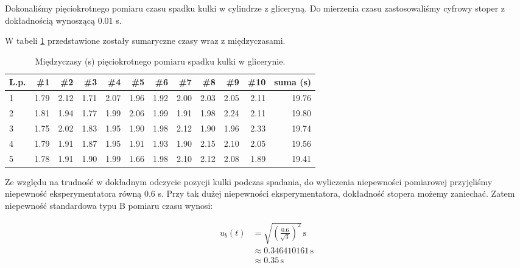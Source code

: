 \documentclass[a4paper]{article}
\newlength{\du}
\begin{document}
Dokonaliśmy pięciokrotnego pomiaru czasu spadku kulki w cylindrze z gliceryną.
Do mierzenia czasu zastosowaliśmy cyfrowy stoper z dokładnością wynoszącą $0.01$ s.

W tabeli \ref{gliceryna} przedstawione zostały sumaryczne czasy wraz z międzyczasami.

\begin{table}[h!]
	\centering
		\begin{tabular}{lrrrrrrrrrrr}
			\toprule
			L.p. &  \#1 & \#2 & \#3 & \#4 & \#5 & \#6 & \#7 & \#8 & \#9 & \#10 & suma (s)\\
			\midrule
			1 &           1.79 &           2.12 &           1.71 &           2.07 &           1.96 &           1.92 &           2.00 &           2.03 &           2.05 &            2.11 & 19.76 \\
			2 &           1.81 &           1.94 &           1.77 &           1.99 &           2.06 &           1.99 &           1.91 &           1.98 &           2.24 &            2.11 & 19.80 \\
			3 &           1.75 &           2.02 &           1.83 &           1.95 &           1.90 &           1.98 &           2.12 &           1.90 &           1.96 &            2.33 & 19.74 \\
			4 &           1.79 &           1.91 &           1.87 &           1.95 &           1.91 &           1.93 &           1.90 &           2.15 &           2.10 &            2.05 & 19.56 \\
			5 &           1.78 &           1.91 &           1.90 &           1.99 &           1.66 &           1.98 &           2.10 &           2.12 &           2.08 &            1.89 & 19.41 \\
			\bottomrule
		\end{tabular}
	\caption{Międzyczasy (s) pięciokrotnego pomiaru spadku kulki w glicerynie.}
	\label{gliceryna}
\end{table}

Ze względu na trudność w dokładnym odczycie pozycji kulki podczas spadania, do wyliczenia niepewności pomiarowej przyjęliśmy niepewność eksperymentatora równą $0.6$ s.
Przy tak dużej niepewności eksperymentatora, dokładność stopera możemy zaniechać.
Zatem niepewność standardowa typu B pomiaru czasu wynosi:

\begin{align*}
	u_b(t) &= \sqrt{\left(\frac{0.6}{\sqrt 3}\right)^2} \, \text{s} \\
	&\approx 0.346410161 \, \text{s} \\
	&\approx 0.35 \, \text{s} \\
\end{align*}
\end{document}
